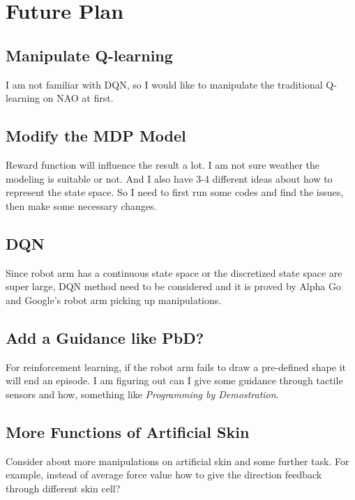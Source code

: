 \documentclass[a4paper, 11pt]{article} %
\begin{document}
\section{Future Plan }

\subsection{Manipulate Q-learning} 
I am not familiar with DQN, so I would like to manipulate the traditional Q-learning on NAO at first.

\subsection{Modify the MDP Model}
Reward function will influence the result a lot. I am not sure weather the modeling is suitable or not. And I also have 3-4 different ideas about how to represent the state space. So I need to first run some codes and find the issues, then make some necessary changes. 

\subsection{DQN}
Since robot arm has a continuous state space or the discretized state space are super large, DQN method need to be considered and it is proved by Alpha Go and Google's robot arm picking up manipulations\cite{gu2017deep}. 

\subsection{Add a Guidance like PbD?}
For reinforcement learning, if the robot arm fails to draw a pre-defined shape it will end an episode. I am figuring out can I give some guidance through tactile sensors and how, something like \textit{Programming by Demostration}\cite{billard2008robot}.

\subsection{More Functions of Artificial Skin}
Consider about more manipulations on artificial skin and some further task. For example, instead  of average force value how to give the direction feedback through different skin cell?







\end{document}
